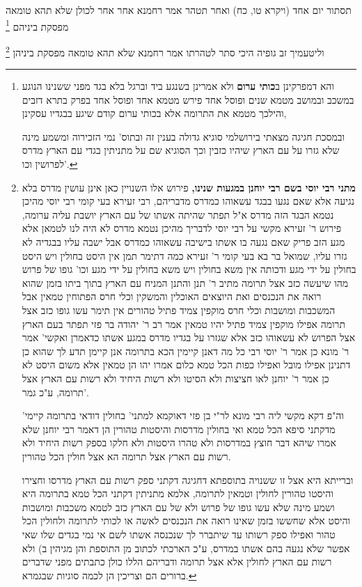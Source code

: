 \documentclass[12pt, openany]{book}
\newcommand{\footnotecomment}[1]{\footnote{#1}}
\newcommand{\commenta}[1]{\footnotecomment{#1}}
\begin{document}
{תסתור יום אחד (ויקרא טו, כח) ואחר תטהר אמר רחמנא אחר אחר לכולן שלא תהא טומאה מפסקת ביניהם 
\commenta{והא דמפרקינן ב\textbf{כותי ערום}  ולא אמרינן בשנגע ביד וברגל בלא בגד מפני ששנינו הנוגע במשכב ובמושב מטמא שנים ופוסל אחד פירש מטמא אחד ופוסל אחד בפרק בתרא דזבים והילכך מטמא את התרומה אלא בכותי ערום קודם שיגע בבגדיו עסקינן,\par ובמסכת חגיגה מצאתי בירושלמי סוגיא גדולה בענין זה ובתוס' נמי הזכירוה ומשמע מינה שלא גזרו על עם הארץ שיהיו כזבין וכך הסוגיא שם על מתניתין בגדי עם הארץ מדרס לפרושין וכו'. }

וליטעמיך זב גופיה היכי סתר  לטהרתו אמר רחמנא שלא תהא טומאה מפסקת ביניהן 
\commenta{\textbf{מתני רבי יוסי בשם רבי יוחנן במגעות שנינו,}  פירוש אלו השנויין כאן אינן עושין מדרס בלא נגיעה אלא שאם נגעו בבגד עשאוהו כמדרס מדבריהם, רבי זעירא בעי קומי רבי יוסי מהיכן נטמא הבגד הזה מדרס א"ל תפתר שהיתה אשתו של עם הארץ יושבת עליה ערומה, פירוש ר' זעירא מקשי על רבי יוסי לדבריך מהיכן נטמא מדרס לא היה לנו לטמאן אלא מגע הזב פריק שאם נגעה בו אשתו בישיבה עשאוהו כמדרס אבל ישבה עליו בבגדיה לא גזרו עליו, שמואל בר בא בעי קומי ר' זעירא כמה דתימר תמן אין היסט בחולין ויש היסט בחולין על ידי מגע ודכותה אין משא בחולין ויש משא בחולין על ידי מגע וכו' גופו של פרוש מהו שיעשה כזב אצל תרומה מתיב ר' תנן והתנן המניח עם הארץ בתוך ביתו בזמן שהוא רואה את הנכנסים ואת היוצאים האוכלין והמשקין וכלי חרס הפתוחין טמאין אבל המשכבות ומושבות וכלי חרס מוקפין צמיד פתיל טהורים אין תימר עשו גופו כזב אצל תרומה אפילו מוקפין צמיד פתיל יהיו טמאין אמר רב ר' יהודה בר פזי תפתר בעם הארץ אצל הפרוש לא עשאוהו כזב אלא שגזרו על בגדיו מדרס במגע אשתו כדאמרן ואקשי' אמר ר' מונא כן אמר ר' יוסי רבי כל מה דאנן קיימין הכא בתרומה אנן קיימן תדע לך שהוא כן דתנינן אפילו מובל ואפילו כפות הכל טמא כלום אמרו יהו הן טמאין אלא משום היסט לא כן אמר ר' יוחנן לאו חציצות ולא הסיטו ולא רשות היחיד ולא רשות עם הארץ אצל תרומה, ע"כ גמר'.\par  וה"פ דקא מקשי ליה רבי מונא לר"י בן פזי דאוקמא למתני' בחולין דודאי בתרומה קיימי' מדקתני סיפא הכל טמא ואי בחולין מדרסות והיסטות טהורין הן דאמר רבי יוחנן שלא אמרו שיהא דבר חוצץ במדרסות ולא טהרו היסטות ולא חלקו בספק רשות היחיד ולא רשות עם הארץ אצל תרומה הא אצל חולין הכל טהורין.\par וברייתא היא אצל זו ששנויה בתוספתא דחגיגה דקתני ספק רשות עם הארץ מדרסו וחצירו והיסטו טהורין לחולין וטמאין לתרומה, אלמא מתניתין דקתני הכל טמא בתרומה היא ושמע מינה שלא עשו גופו של פרוש ולא של עם הארץ כזב לטמא משכבות ומושבות והיסט אלא שחששו בזמן שאינו רואה את הנכנסים לאשה או לכותי לתרומה ולחולין הכל טהור ואפילו ספק רשותו עד שיתברר לך שנכנסה אשתו לשם אי נמי בגדים שלו שאי אפשר שלא נגעה בהם אשתו במדרס, ע"כ הארכתי לכתוב מן התוספת והן מגיהין ב) ולא רשות עם הארץ לחולין אלא אצל תרומה ודבריהם הללו כולן כתבתים מפני שדברים ברורים הם וצריכין הן לכמה סוגיות שבגמרא. }

}
\end{document}
